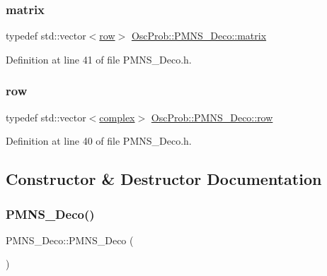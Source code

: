 \subsubsection{\texorpdfstring{matrix}{matrix}}
{\footnotesize\ttfamily typedef std\+::vector$<$\hyperlink{classOscProb_1_1PMNS__Deco_a34634741bc68bc1c524cf47f44e7f5b6}{row}$>$ \hyperlink{classOscProb_1_1PMNS__Deco_a77b4e0c041b6268910a270be0f5387c9}{Osc\+Prob\+::\+P\+M\+N\+S\+\_\+\+Deco\+::matrix}}



Definition at line 41 of file P\+M\+N\+S\+\_\+\+Deco.\+h.

\mbox{\label{classOscProb_1_1PMNS__Deco_a34634741bc68bc1c524cf47f44e7f5b6}} 
\subsubsection{\texorpdfstring{row}{row}}
{\footnotesize\ttfamily typedef std\+::vector$<$\hyperlink{classOscProb_1_1PMNS__Base_ae86ec4718808ce9d02e5f5b4226714ab}{complex}$>$ \hyperlink{classOscProb_1_1PMNS__Deco_a34634741bc68bc1c524cf47f44e7f5b6}{Osc\+Prob\+::\+P\+M\+N\+S\+\_\+\+Deco\+::row}}



Definition at line 40 of file P\+M\+N\+S\+\_\+\+Deco.\+h.



\subsection{Constructor \& Destructor Documentation}
\mbox{\label{classOscProb_1_1PMNS__Deco_a976dc43bb65547af5f4a27f5a8fccbba}} 
\subsubsection{\texorpdfstring{P\+M\+N\+S\+\_\+\+Deco()}{PMNS\_Deco()}}
{\footnotesize\ttfamily P\+M\+N\+S\+\_\+\+Deco\+::\+P\+M\+N\+S\+\_\+\+Deco (\begin{DoxyParamCaption}{ }\end{DoxyParamCaption})}

